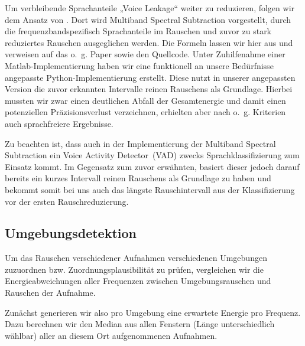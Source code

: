 \documentclass[
	fontsize=10.5pt,
	marginpar=false,
	ngerman,
	accentcolor=3d
	]{tudapub}
\begin{document}
Um verbleibende Sprachanteile „Voice Leakage“ weiter zu reduzieren, folgen wir dem Ansatz von \cite{kamath_multi-band_2002}. Dort wird Multiband Spectral Subtraction vorgestellt, durch die frequenzbandspezifisch Sprachanteile im Rauschen und zuvor zu stark reduziertes Rauschen ausgeglichen werden. Die Formeln lassen wir hier aus und verweisen auf das o.~g. Paper sowie den Quellcode. Unter Zuhilfenahme einer Matlab-Implementierung \cite{zavarehei_multi-band_nodate} haben wir eine funktionell an unsere Bedürfnisse angepasste Python-Implementierung erstellt. Diese nutzt in unserer angepassten Version die zuvor erkannten Intervalle reinen Rauschens als Grundlage. Hierbei mussten wir zwar einen deutlichen Abfall der Gesamtenergie und damit einen potenziellen Präzisionsverlust verzeichnen, erhielten aber nach o.~g. Kriterien auch sprachfreiere Ergebnisse.

Zu beachten ist, dass auch in der Implementierung der Multiband Spectral Subtraction ein Voice Activity Detector~(VAD) zwecks Sprachklassifizierung zum Einsatz kommt. Im Gegensatz zum zuvor erwähnten, basiert dieser jedoch darauf bereits ein kurzes Intervall reinen Rauschens als Grundlage zu haben und bekommt somit bei uns auch das längste Rauschintervall aus der Klassifizierung vor der ersten Rauschreduzierung.

\pagebreak
\subsection{Umgebungsdetektion}
\label{envdetect}

Um das Rauschen verschiedener Aufnahmen verschiedenen Umgebungen zuzuordnen bzw. Zuordnungsplausibilität zu prüfen, vergleichen wir die Energieabweichungen aller Frequenzen zwischen Umgebungsrauschen und Rauschen der Aufnahme.

Zunächst generieren wir also pro Umgebung eine erwartete Energie pro Frequenz. Dazu berechnen wir den Median aus allen Fenstern (Länge unterschiedlich wählbar) aller an diesem Ort aufgenommenen Aufnahmen.
\end{document}
